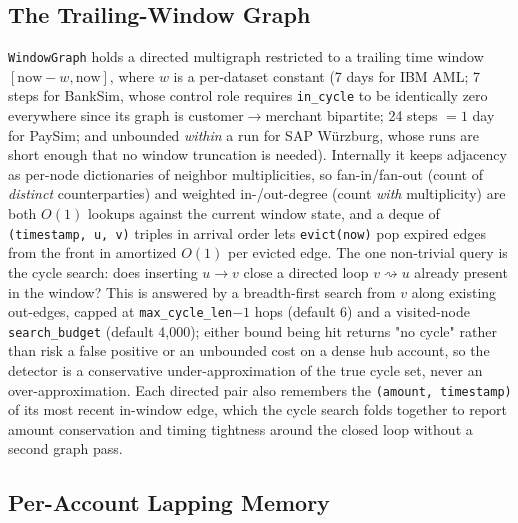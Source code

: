\subsection{The Trailing-Window Graph}\label{sec:engine-windowgraph}

\texttt{WindowGraph} holds a directed multigraph restricted to a trailing
time window $[\mathrm{now} - w, \mathrm{now}]$, where $w$ is a per-dataset
constant (7 days for IBM AML; 7 steps for BankSim, whose control role
requires \texttt{in\_cycle} to be identically zero everywhere since its
graph is customer$\to$merchant bipartite; 24 steps $=1$ day for PaySim; and
unbounded \emph{within} a run for SAP Würzburg, whose runs are short enough
that no window truncation is needed). Internally it keeps adjacency as
per-node dictionaries of neighbor multiplicities, so fan-in/fan-out (count of
\emph{distinct} counterparties) and weighted in-/out-degree (count
\emph{with} multiplicity) are both $O(1)$ lookups against the current
window state, and a deque of \texttt{(timestamp, u, v)} triples in arrival
order lets \texttt{evict(now)} pop expired edges from the front in amortized
$O(1)$ per evicted edge. The one non-trivial query is the cycle search: does
inserting $u \to v$ close a directed loop $v \rightsquigarrow u$ already
present in the window? This is answered by a breadth-first search from $v$
along existing out-edges, capped at \texttt{max\_cycle\_len}$-1$ hops (default
6) and a visited-node \texttt{search\_budget} (default 4{,}000); either bound
being hit returns "no cycle" rather than risk a false positive or an
unbounded cost on a dense hub account, so the detector is a conservative
under-approximation of the true cycle set, never an over-approximation. Each
directed pair also remembers the \texttt{(amount, timestamp)} of its most
recent in-window edge, which the cycle search folds together to report
amount conservation and timing tightness around the closed loop without a
second graph pass.

\subsection{Per-Account Lapping Memory}\label{sec:engine-lapmemory}

